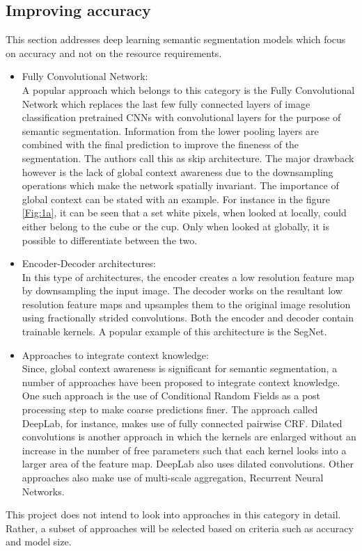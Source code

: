 \documentclass[a4paper,12pt]{article}
\begin{document}
\subsection{Improving accuracy}
This section addresses deep learning semantic segmentation models which focus on accuracy and not on the resource requirements. \\
\begin{itemize}
	\item Fully Convolutional Network:\cite{5} \\
		A popular approach which belongs to this category is the Fully Convolutional Network\cite{6} which replaces the last few fully connected layers of image classification pretrained CNNs with convolutional layers for the purpose of semantic segmentation. Information from the lower pooling layers are combined with the final prediction to improve the fineness of the segmentation. The authors call this as skip architecture. The major drawback however is the lack of global context awareness due to the downsampling operations which make the network spatially invariant. The importance of global context can be stated with an example. For instance in the figure \ref{Fig:1a}, it can be seen that a set white pixels, when looked at locally, could either belong to the cube or the cup. Only when looked at globally, it is possible to differentiate between the two.
		\item Encoder-Decoder architectures:\cite{5}\\
		In this type of architectures, the encoder creates a low resolution feature map by downsampling the input image. The decoder works on the resultant low resolution feature maps and upsamples them to the original image resolution using fractionally strided convolutions. Both the encoder and decoder contain trainable kernels. A popular example of this architecture is the SegNet\cite{7}.
		\item Approaches to integrate context knowledge:\cite{5}\\
		Since, global context awareness is significant for semantic segmentation, a number of approaches have been proposed to integrate context knowledge. \\
		One such approach is the use of Conditional Random Fields as a post processing step to make coarse predictions finer. The approach called DeepLab\cite{4}, for instance, makes use of fully connected pairwise CRF. Dilated convolutions is another approach in which the kernels are enlarged without an increase in the number of free parameters such that each kernel looks into a larger area of the feature map. DeepLab\cite{4} also uses dilated convolutions. Other approaches also make use of multi-scale aggregation, Recurrent Neural Networks.\\
\end{itemize}
This project does not intend to look into approaches in this category in detail. Rather, a subset of approaches will be selected based on criteria such as accuracy and model size.
\end{document}
